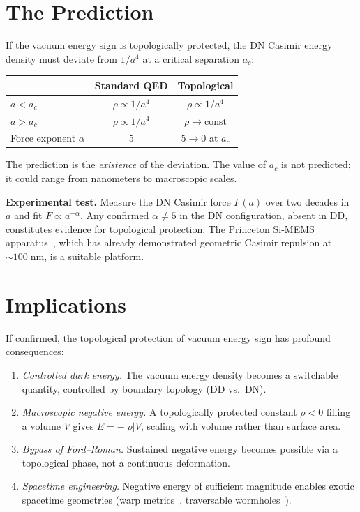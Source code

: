 \documentclass[aps,prl,twocolumn,superscriptaddress,nofootinbib]{revtex4-2}
\begin{document}
\section{The Prediction}

If the vacuum energy sign is topologically protected, the DN
Casimir energy density must deviate from $1/a^4$ at a critical
separation $a_c$:

\begin{center}
\begin{tabular}{lcc}
\toprule
& Standard QED & Topological \\
\midrule
$a<a_c$ & $\rho\propto 1/a^4$ & $\rho\propto 1/a^4$ \\
$a>a_c$ & $\rho\propto 1/a^4$ & $\rho\to\mathrm{const}$ \\
\midrule
Force exponent $\alpha$ & $5$ & $5\to 0$ at $a_c$ \\
\bottomrule
\end{tabular}
\end{center}

The prediction is the \emph{existence} of the deviation.  The
value of $a_c$ is not predicted; it could range from nanometers
to macroscopic scales.

\medskip
\noindent\textbf{Experimental test.}  Measure the DN Casimir
force $F(a)$ over two decades in $a$ and fit $F\propto a^{-\alpha}$.
Any confirmed $\alpha\neq 5$ in the DN configuration, absent in DD,
constitutes evidence for topological protection.  The Princeton
Si-MEMS apparatus~\cite{Princeton2017}, which has already
demonstrated geometric Casimir repulsion at $\sim 100\;\mathrm{nm}$,
is a suitable platform.

\section{Implications}

If confirmed, the topological protection of vacuum energy sign has
profound consequences:

\begin{enumerate}
\item \emph{Controlled dark energy.}  The vacuum energy density
becomes a switchable quantity, controlled by boundary topology
(DD vs.\ DN).
\item \emph{Macroscopic negative energy.}  A topologically
protected constant $\rho<0$ filling a volume $V$ gives $E=-|\rho|V$,
scaling with volume rather than surface area.
\item \emph{Bypass of Ford--Roman.}  Sustained negative energy
becomes possible via a topological phase, not a continuous
deformation.
\item \emph{Spacetime engineering.}  Negative energy of sufficient
magnitude enables exotic spacetime geometries (warp
metrics~\cite{Alcubierre1994}, traversable
wormholes~\cite{Visser1995}).
\end{enumerate}
\end{document}
